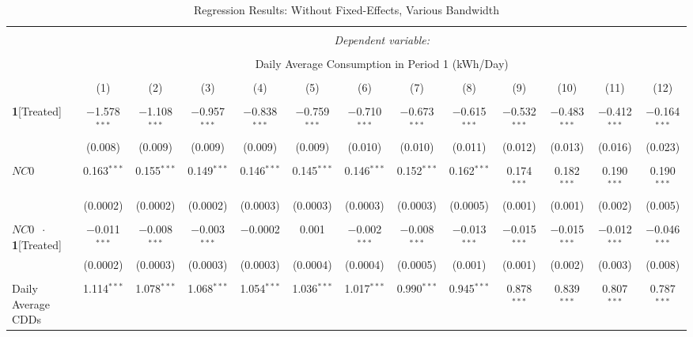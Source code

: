 \begin{table}[!htbp]
\centering 
\caption{Regression Results: Without Fixed-Effects, Various Bandwidth} 
\label{Table:Regression-Results_Daily-Average_BWs-Without-FEs} 
\small
\begin{adjustbox}{scale = 0.8} 
\begin{tabular}{@{\extracolsep{5pt}}lcccccccccccc} 
\\[-1.8ex]\hline 
\hline \\[-1.8ex] 
 & \multicolumn{12}{c}{\textit{Dependent variable:}} \\ 
\cline{2-13} 
\\[-1.8ex] & \multicolumn{12}{c}{Daily Average Consumption in Period 1 (kWh/Day)} \\ 
\\[-1.8ex] & (1) & (2) & (3) & (4) & (5) & (6) & (7) & (8) & (9) & (10) & (11) & (12)\\ 
\hline \\[-1.8ex] 
 \textbf{1}[Treated] & $-$1.578$^{***}$ & $-$1.108$^{***}$ & $-$0.957$^{***}$ & $-$0.838$^{***}$ & $-$0.759$^{***}$ & $-$0.710$^{***}$ & $-$0.673$^{***}$ & $-$0.615$^{***}$ & $-$0.532$^{***}$ & $-$0.483$^{***}$ & $-$0.412$^{***}$ & $-$0.164$^{***}$ \\ 
  & (0.008) & (0.009) & (0.009) & (0.009) & (0.009) & (0.010) & (0.010) & (0.011) & (0.012) & (0.013) & (0.016) & (0.023) \\ 
  & & & & & & & & & & & & \\ 
 $NC0$ & 0.163$^{***}$ & 0.155$^{***}$ & 0.149$^{***}$ & 0.146$^{***}$ & 0.145$^{***}$ & 0.146$^{***}$ & 0.152$^{***}$ & 0.162$^{***}$ & 0.174$^{***}$ & 0.182$^{***}$ & 0.190$^{***}$ & 0.190$^{***}$ \\ 
  & (0.0002) & (0.0002) & (0.0002) & (0.0003) & (0.0003) & (0.0003) & (0.0003) & (0.0005) & (0.001) & (0.001) & (0.002) & (0.005) \\ 
  & & & & & & & & & & & & \\ 
 $NC0$ $\ \cdot \ $ \textbf{1}[Treated] & $-$0.011$^{***}$ & $-$0.008$^{***}$ & $-$0.003$^{***}$ & $-$0.0002 & 0.001 & $-$0.002$^{***}$ & $-$0.008$^{***}$ & $-$0.013$^{***}$ & $-$0.015$^{***}$ & $-$0.015$^{***}$ & $-$0.012$^{***}$ & $-$0.046$^{***}$ \\ 
  & (0.0002) & (0.0003) & (0.0003) & (0.0003) & (0.0004) & (0.0004) & (0.0005) & (0.001) & (0.001) & (0.002) & (0.003) & (0.008) \\ 
  & & & & & & & & & & & & \\ 
 Daily Average CDDs & 1.114$^{***}$ & 1.078$^{***}$ & 1.068$^{***}$ & 1.054$^{***}$ & 1.036$^{***}$ & 1.017$^{***}$ & 0.990$^{***}$ & 0.945$^{***}$ & 0.878$^{***}$ & 0.839$^{***}$ & 0.807$^{***}$ & 0.787$^{***}$ \\ 

\end{tabular}
\end{adjustbox}
\end{table}
